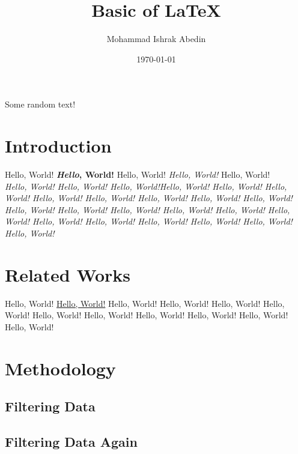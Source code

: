 \documentclass[12pt, a4paper]{article}
\title{Basic of \LaTeX}
\author{Mohammad Ishrak Abedin}
\date{\today} %
\begin{document}

    \begin{titlepage}
        \maketitle
        Some random text!
        \tableofcontents
    \end{titlepage}

    \begin{abstract}
        \kant[5]
    \end{abstract}

    \section{Introduction}
    Hello, World! \textbf{\textit{Hello}, World!} Hello, World! \textit{Hello, World!} Hello, World! \\
    \emph{Hello, World! Hello, World! Hello, World!Hello, World! \emph{Hello, World! Hello, World! Hello, World! Hello, World! Hello, World! Hello, World! Hello, World! Hello, World! Hello, World! Hello, World! Hello, World! Hello, World! Hello, World! Hello, World! Hello, World! Hello, World!} Hello, World! Hello, World! Hello, World!}

    \section{Related Works}
    Hello, World! \underline{Hello, World!} Hello, World! Hello, World! Hello, World! Hello, World! Hello, World! Hello, World! Hello, World! Hello, World! Hello, World! Hello, World!

    \section{Methodology}
    \kant[2-4]
    
    \subsection{Filtering Data}
    \kant[1]

    \subsection{Filtering Data Again}
    \kant[1]
\end{document}
